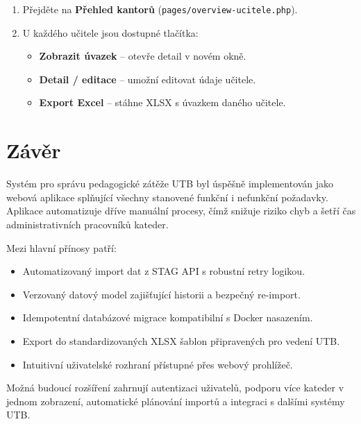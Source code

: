 \documentclass[12pt,a4paper]{report}
\begin{document}
\begin{enumerate}
  \item Přejděte na \textbf{Přehled kantorů} (\texttt{pages/overview-ucitele.php}).
  \item U každého učitele jsou dostupné tlačítka:
    \begin{itemize}
      \item \textbf{Zobrazit úvazek} -- otevře detail v novém okně.
      \item \textbf{Detail / editace} -- umožní editovat údaje učitele.
      \item \textbf{Export Excel} -- stáhne XLSX s úvazkem daného učitele.
    \end{itemize}
\end{enumerate}

\chapter{Závěr}

Systém pro správu pedagogické zátěže UTB byl úspěšně implementován jako webová aplikace splňující všechny stanovené funkční i nefunkční požadavky. Aplikace automatizuje dříve manuální procesy, čímž snižuje riziko chyb a šetří čas administrativních pracovníků kateder.

Mezi hlavní přínosy patří:
\begin{itemize}
  \item Automatizovaný import dat z STAG API s robustní retry logikou.
  \item Verzovaný datový model zajišťující historii a bezpečný re-import.
  \item Idempotentní databázové migrace kompatibilní s Docker nasazením.
  \item Export do standardizovaných XLSX šablon připravených pro vedení UTB.
  \item Intuitivní uživatelské rozhraní přístupné přes webový prohlížeč.
\end{itemize}

Možná budoucí rozšíření zahrnují autentizaci uživatelů, podporu více kateder v jednom zobrazení, automatické plánování importů a integraci s dalšími systémy UTB.
\end{document}
